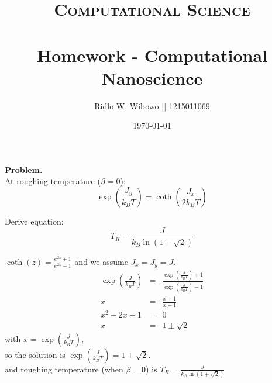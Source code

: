 \documentclass[paper=a4, fontsize=11pt]{scrartcl}
\title{	
\normalfont \normalsize 
\textsc{Computational Science} \\ [25pt] %
\horrule{0.5pt} \\[0.2cm] %
\small Homework - Computational Nanoscience\\ %
}
\author{\small{Ridlo W. Wibowo || 1215011069}} %
\date{\small\today} %
\numberwithin{equation}{section} %
\numberwithin{figure}{section} %
\numberwithin{table}{section} %
\begin{document}
\maketitle %

\textbf{Problem.}\\
At roughing temperature ($\beta = 0$):
\begin{equation*}
\exp{(\frac{J_y}{k_B T})} = \coth{(\frac{J_x}{2 k_B T})} 
\end{equation*}

Derive equation:
\begin{equation*}
T_{R} = \frac{J}{k_B \ln{(1+\sqrt{2})}}
\end{equation*}

$\coth(z) = \frac{e^{2z} + 1}{e^{2z} - 1}$ and we assume $J_x = J_y = J$. 
\begin{eqnarray*}
\exp{(\frac{J}{k_B T})} &=& \frac{\exp{(\frac{J}{k_B T})} + 1}{\exp{(\frac{J}{k_B T})} - 1} \\
x &=& \frac{x + 1}{x - 1} \\
x^2 - 2x - 1 &=& 0 \\
x &=& 1 \pm \sqrt{2}
\end{eqnarray*}
with $x = \exp{(\frac{J}{k_B T})}$,\\ 
so the solution is $\exp{(\frac{J}{k_B T})} = 1 + \sqrt{2}$.\\
and roughing temperature (when $\beta = 0$) is $T_R = \frac{J}{k_B \ln{(1+\sqrt{2})}}$ 
\end{document}
